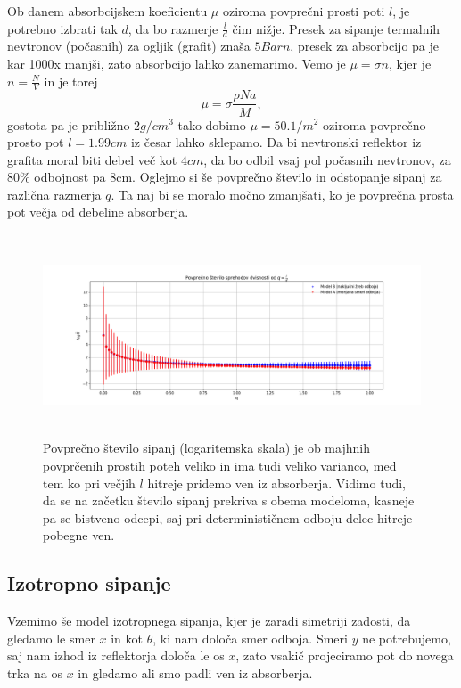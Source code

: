 \documentclass[11pt, a4paper]{article}
\begin{document}
Ob danem absorbcijskem koeficientu $\mu$ oziroma povprečni prosti poti $l$, je potrebno izbrati tak $d$, da bo razmerje $\frac{l}{d}$ čim nižje. 
\newline\newline Presek za sipanje termalnih nevtronov (počasnih) za ogljik (grafit) znaša $5 Barn$, presek za absorbcijo pa je kar 1000x manjši, zato absorbcijo lahko zanemarimo. Vemo je $\mu  = \sigma n$, kjer je $n = \frac{N}{V}$ in je torej 
\begin{equation}
\mu = \sigma \frac{\rho Na}{M},
\end{equation}
gostota pa je približno $2 g /cm^3$ tako dobimo $\mu = 50.1/m^2$ oziroma povprečno prosto pot $l = 1.99 cm$ iz česar lahko sklepamo. Da bi nevtronski reflektor iz grafita moral biti debel več kot $4cm$, da bo odbil vsaj pol počasnih nevtronov, za $ 80 \% $ odbojnost pa 8cm.
\newline\newline
Oglejmo si še povprečno število in odstopanje sipanj za različna razmerja $q$. Ta naj bi se moralo močno zmanjšati, ko je povprečna prosta pot večja od debeline absorberja.
\begin{figure}[H]
\hspace*{-2.5cm}  
  \includegraphics[width=22cm, height = 6cm]{tretja_stevilo.png}
 \caption{Povprečno število sipanj (logaritemska skala) je ob majhnih povprčenih prostih poteh veliko in ima tudi veliko varianco, med tem ko pri večjih $l$ hitreje pridemo ven iz absorberja. Vidimo tudi, da se na začetku število sipanj prekriva s obema modeloma, kasneje pa se bistveno odcepi, saj pri determinističnem odboju delec hitreje pobegne ven. }
\end{figure}
\subsection{Izotropno sipanje}
Vzemimo še model izotropnega sipanja, kjer je zaradi simetriji zadosti, da gledamo le smer $x$ in kot $\theta$, ki nam določa smer odboja. Smeri $y$ ne potrebujemo, saj nam izhod iz reflektorja določa le os $x$, zato vsakič projeciramo pot do novega trka na os $x$ in gledamo ali smo padli ven iz absorberja. 
\end{document}
